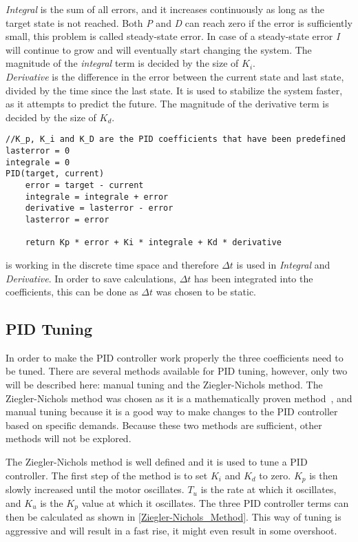 \emph{Integral} is the sum of all errors, and it increases continuously as long as the target state is not reached. Both \emph{P} and \emph{D} can reach zero if the error is sufficiently small, this problem is called steady-state error. In case of a steady-state error \emph{I} will continue to grow and will eventually start changing the system. The magnitude of the \emph{integral} term is decided by the size of $K_i$.\\

\emph{Derivative} is the difference in the error between the current state and last state, divided by the time since the last state. It is used to stabilize the system faster, as it attempts to predict the future. The magnitude of the derivative term is decided by the size of $K_d$. 


\begin{lstlisting}[style=customc, label={pidpseudo1}, caption={Pseudo code of a PID controller}]
//K_p, K_i and K_D are the PID coefficients that have been predefined
lasterror = 0
integrale = 0
PID(target, current)
    error = target - current
    integrale = integrale + error
    derivative = lasterror - error
    lasterror = error

    return Kp * error + Ki * integrale + Kd * derivative
\end{lstlisting}

 is working in the discrete time space and therefore $\Delta t$ is used in \emph{Integral} and \emph{Derivative}. In order to save calculations, $\Delta t$ has been integrated into the coefficients, this can be done as $\Delta t$ was chosen to be static.

\subsection{PID Tuning}
In order to make the PID controller work properly the three coefficients need to be tuned. There are several methods available for PID tuning, however, only two will be described here: manual tuning and the Ziegler-Nichols method. The Ziegler-Nichols method was chosen as it is a mathematically proven method~\cite{Ziegler-Nichols}, and manual tuning because it is a good way to make changes to the PID controller based on specific demands. Because these two methods are sufficient, other methods will not be explored.



The Ziegler-Nichols method is well defined and it is used to tune a PID controller. The first step of the method is to set $K_i$ and $K_d$ to zero. $K_p$ is then slowly increased until the motor oscillates. $T_u$ is the rate at which it oscillates, and $K_u$ is the $K_p$ value at which it oscillates. The three PID controller terms can then be calculated as shown in \cref{Ziegler-Nichols_Method}. This way of tuning is aggressive and will result in a fast rise, it might even result in some overshoot.

